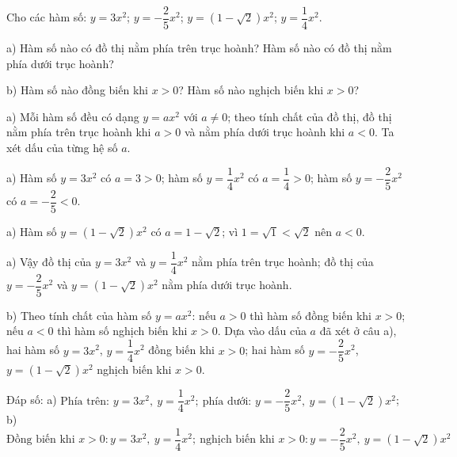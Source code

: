 \begin{problem}[9DS-HSB2-021]
Cho các hàm số: $y = 3x^2$; $y = -\dfrac{2}{5}x^2$; $y = \left(1 - \sqrt{2}\right)x^2$; $y = \dfrac{1}{4}x^2$.

a) Hàm số nào có đồ thị nằm phía trên trục hoành? Hàm số nào có đồ thị nằm phía dưới trục hoành?

b) Hàm số nào đồng biến khi $x > 0$? Hàm số nào nghịch biến khi $x > 0$?

\begin{solution}
a) Mỗi hàm số đều có dạng $y = ax^2$ với $a \neq 0$; theo tính chất của đồ thị, đồ thị nằm phía trên trục hoành khi $a > 0$ và nằm phía dưới trục hoành khi $a < 0$. Ta xét dấu của từng hệ số $a$.

a) Hàm số $y = 3x^2$ có $a = 3 > 0$; hàm số $y = \dfrac{1}{4}x^2$ có $a = \dfrac{1}{4} > 0$; hàm số $y = -\dfrac{2}{5}x^2$ có $a = -\dfrac{2}{5} < 0$.

a) Hàm số $y = \left(1 - \sqrt{2}\right)x^2$ có $a = 1 - \sqrt{2}$; vì $1 = \sqrt{1} < \sqrt{2}$ nên $a < 0$.

a) Vậy đồ thị của $y = 3x^2$ và $y = \dfrac{1}{4}x^2$ nằm phía trên trục hoành; đồ thị của $y = -\dfrac{2}{5}x^2$ và $y = \left(1 - \sqrt{2}\right)x^2$ nằm phía dưới trục hoành.

b) Theo tính chất của hàm số $y = ax^2$: nếu $a > 0$ thì hàm số đồng biến khi $x > 0$; nếu $a < 0$ thì hàm số nghịch biến khi $x > 0$. Dựa vào dấu của $a$ đã xét ở câu a), hai hàm số $y = 3x^2$, $y = \dfrac{1}{4}x^2$ đồng biến khi $x > 0$; hai hàm số $y = -\dfrac{2}{5}x^2$, $y = \left(1 - \sqrt{2}\right)x^2$ nghịch biến khi $x > 0$.

Đáp số: a) $\boxed{\text{Phía trên: } y = 3x^2,\ y = \dfrac{1}{4}x^2;\ \text{phía dưới: } y = -\dfrac{2}{5}x^2,\ y = \left(1 - \sqrt{2}\right)x^2}$; b) $\boxed{\text{Đồng biến khi } x > 0\colon y = 3x^2,\ y = \dfrac{1}{4}x^2;\ \text{nghịch biến khi } x > 0\colon y = -\dfrac{2}{5}x^2,\ y = \left(1 - \sqrt{2}\right)x^2}$
\end{solution}
\end{problem}


